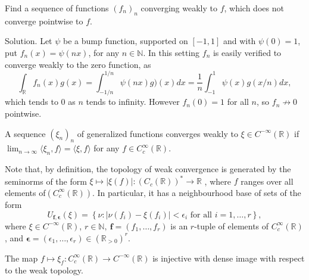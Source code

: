\documentclass[12pt, draft,reqno,a4paper, twoside]{amsproc}
\newcommand{\dbN}{\mathbb N}
\newcommand{\dbR}{\mathbb R}
\newcommand{\gen}[1]{\langle{#1}\rangle}
\newcommand{\set}[1]{\left\{{#1}\right\}}
\newcommand{\abs}[1]{\left|#1\right|}
\newenvironment{sol}{\sc Solution. \rm}{\hfill \qedsymbol\bigskip}
\begin{document}
\begin{exer}Find a sequence of functions $(f_n)_n$ converging weakly to $f$, which does not converge pointwise to $f$. 
\end{exer} 
\begin{sol}
Let $\psi$ be a bump function, supported on $[-1,1]$ and with $\psi(0)=1$,  put $f_n(x)=\psi(nx)$, for any $n\in \dbN$. In this setting $f_n$ is easily verified to converge weakly to the zero function, as
\[\int_{\dbR}f_n(x)g(x)=\int_{-1/n}^{1/n}\psi(nx)g)(x)dx=\frac{1}{n}\int_{-1}^{1}\psi(x)g(x/n)dx,\]
which tends to $0$ as $n$ tends to infinity. However $f_n(0)=1$ for all $n$, so $f_n\not\to 0$ pointwise.
\end{sol}

\begin{defi}A sequence $(\xi_n)_n$ of generalized functions converges weakly to $\xi\in C^{-\infty}(\dbR)$ if $\lim_{n\to\infty}\gen{\xi_n,f}=\gen{\xi,f}$ for any $f\in C_c^\infty(\dbR)$. 
\end{defi}
Note that, by definition, the topology of weak convergence is generated by the seminorms  of the form $\xi\mapsto \abs{\xi(f)}:(C_c(\dbR))^*\to\dbR$ , where $f$ ranges over all elements of$(C_c^\infty(\dbR))$. In particular, it has a neighbourhood base of sets of the form
\begin{equation}\label{equation:base-of-weak}
U_{\boldsymbol{f},\boldsymbol{\epsilon}}(\xi)=\set{\nu:\abs{\nu(f_i)-\xi(f_i)}<\epsilon_i\text{ for all }i=1,\ldots,r},
\end{equation}
where $\xi\in C^{-\infty}(\dbR)$, $r\in\dbN,\:\boldsymbol{f}=(f_1,\ldots,f_r)$ is an $r$-tuple of elements of $C_c^\infty(\dbR)$, and $\boldsymbol{\epsilon}=(\epsilon_1,\ldots,\epsilon_r)\in(\dbR_{>0})^r$. 
\begin{exer}The map $f\mapsto \xi_f:C_c^\infty(\dbR)\to C^{-\infty}(\dbR)$ is injective with dense image with respect to the weak topology.
\end{exer} 
\end{document}
